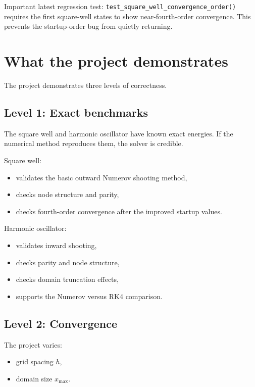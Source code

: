 \documentclass[11pt]{article}
\begin{document}
    Important latest regression test: \texttt{test\_square\_well\_convergence\_order()} requires the first square-well states to show near-fourth-order convergence. This prevents the startup-order bug from quietly returning.

    \section{What the project demonstrates}

    The project demonstrates three levels of correctness.

    \subsection{Level 1: Exact benchmarks}

    The square well and harmonic oscillator have known exact energies. If the numerical method reproduces them, the solver is credible.

    Square well:
    \begin{itemize}
        \item validates the basic outward Numerov shooting method,
        \item checks node structure and parity,
        \item checks fourth-order convergence after the improved startup values.
    \end{itemize}

    Harmonic oscillator:
    \begin{itemize}
        \item validates inward shooting,
        \item checks parity and node structure,
        \item checks domain truncation effects,
        \item supports the Numerov versus RK4 comparison.
    \end{itemize}

    \subsection{Level 2: Convergence}

    The project varies:
    \begin{itemize}
        \item grid spacing $h$,
        \item domain size $x_{\max}$.
    \end{itemize}
\end{document}
